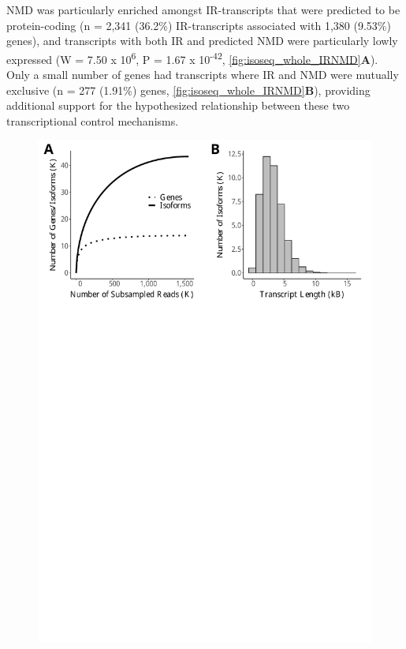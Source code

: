 NMD was particularly enriched amongst IR-transcripts that were predicted to be protein-coding (n = 2,341 (36.2\%) IR-transcripts associated with 1,380 (9.53\%) genes), and transcripts with both IR and predicted NMD were particularly lowly expressed (W = 7.50 x 10\textsuperscript{6}, P = 1.67 x 10\textsuperscript{-42}, \cref{fig:isoseq_whole_IRNMD}\textbf{A}). Only a small number of genes had transcripts where IR and NMD were mutually exclusive (n = 277 (1.91\%) genes, \cref{fig:isoseq_whole_IRNMD}\textbf{B}), providing additional support for the hypothesized relationship between these two transcriptional control mechanisms\cite{Ge2014}. 


\begin{figure}[!h]
	\begin{center}
		\includegraphics[page=6,trim={0 26cm 0 0},clip,scale = 0.55]{Figures/IsoSeqWholeTranscriptome.pdf}

\end{center}
\end{figure}
